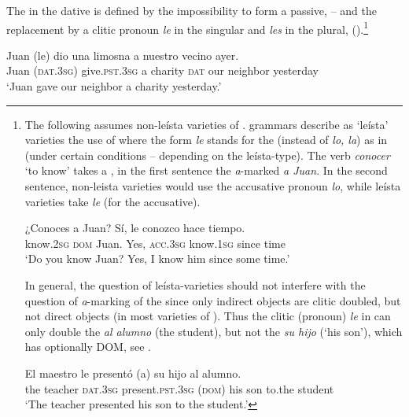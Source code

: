 \documentclass[output=paper]{LSP/langsci}
\begin{document}
The  in the dative is defined by the impossibility to form a passive, \cf {}-- and the replacement by a clitic pronoun \textit{le} in the singular and \textit{les} in the plural, (\cf {}).\footnote{The following assumes non-leísta varieties of .  grammars describe as ‘leísta’ varieties the use of  where the form \textit{le} stands for the  (instead of \textit{lo, la}) as in  (under certain conditions – depending on the leísta-type). The verb \textit{conocer} ‘to know’ takes a , in the first sentence the \textit{a}-marked  \textit{a Juan}. In the second sentence, non-leista varieties would use the accusative pronoun \textit{lo}, while leísta varieties take \textit{le} (for the accusative). 

\ea
\label{11-he-ex:i}
\gll ¿Conoces a Juan? Sí, le conozco hace tiempo.\\ %
know.\textsc{2sg} \textsc{dom} Juan. Yes, \textsc{acc}.\textsc{3sg} know.\textsc{1sg} since time\\
 \glt ‘Do you know Juan? Yes, I know him since some time.’
\z

In general, the question of leísta-varieties should not interfere with the question of \textit{a}-marking of the  since only  indirect objects are clitic doubled, but not direct objects (in most varieties of ). Thus the clitic (pronoun) \textit{le} in  can only double the  \textit{al alumno} (the student), but not the  \textit{su hijo} (‘his son’), which has optionally DOM, see \citet{Fernandez-Ordonez1999Leismo}.

\ea
\label{11-he-ex:ii}
\gll El maestro le presentó (a) su hijo al alumno.\\
the teacher \textsc{dat}.\textsc{3sg} present.\textsc{pst.3sg} (\textsc{dom}) his son to.the student\\
\glt ‘The teacher presented his son to the student.’
\z
}


\ea%
\label{11-he-ex:29}

\gll Juan (le) dio una limosna a nuestro vecino ayer.\\
Juan (\textsc{dat.3sg}) give.\textsc{pst.3sg} a charity \textsc{dat} our neighbor yesterday\\
\glt ‘Juan gave our neighbor a charity yesterday.’
\z
\end{document}
